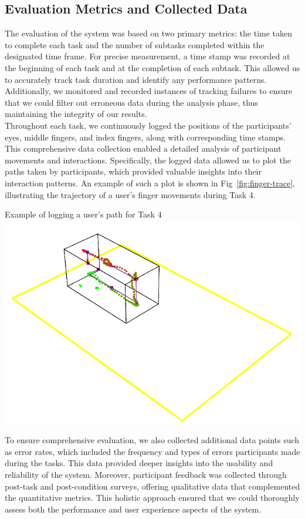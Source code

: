 \subsection{Evaluation Metrics and Collected Data}

The evaluation of the system was based on two primary metrics: the time taken to complete each task and the number of subtasks completed within the designated time frame. For precise measurement, a time stamp was recorded at the beginning of each task and at the completion of each subtask. This allowed us to accurately track task duration and identify any performance patterns. Additionally, we monitored and recorded instances of tracking failures to ensure that we could filter out erroneous data during the analysis phase, thus maintaining the integrity of our results. \\

Throughout each task, we continuously logged the positions of the participants' eyes, middle fingers, and index fingers, along with corresponding time stamps. This comprehensive data collection enabled a detailed analysis of participant movements and interactions. Specifically, the logged data allowed us to plot the paths taken by participants, which provided valuable insights into their interaction patterns. An example of such a plot is shown in Fig~\ref{fig:finger-trace}, illustrating the trajectory of a user's finger movements during Task 4.

\begin{figureBox}[label={fig:finger-trace}, width=0.8\linewidth]{Example of logging a user's path for Task 4}
    \includegraphics[width = 0.8\linewidth]{./implementation/figures/finger-trace-plot.png}
\end{figureBox}

To ensure comprehensive evaluation, we also collected additional data points such as error rates, which included the frequency and types of errors participants made during the tasks. This data provided deeper insights into the usability and reliability of the system. Moreover, participant feedback was collected through post-task and post-condition surveys, offering qualitative data that complemented the quantitative metrics. This holistic approach ensured that we could thoroughly assess both the performance and user experience aspects of the system.

